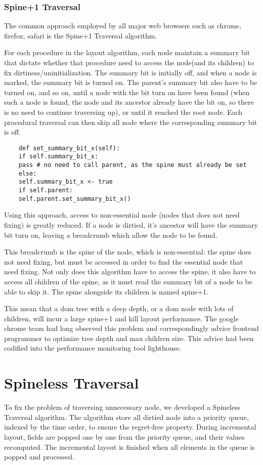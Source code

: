 \documentclass[format=acmsmall, review=false, screen=true]{acmart}
\begin{document}
\subsubsection{Spine+1 Traversal}
The common approach employed by all major web browsers such as chrome, firefox, safari is the Spine+1 Traversal algorithm.

For each procedure in the layout algorithm, each node maintain a summary bit that dictate whether that procedure need to access the node(and its children) to fix dirtiness/uninitialization. The summary bit is initially off, and when a node is marked, the summary bit is turned on. The parent's summary bit also have to be turned on, and so on, until a node with the bit turn on have been found (when such a node is found, the node and its ancestor already have the bit on, so there is no need to continue traversing up), or until it reached the root node.  Each procedural traversal can then skip all node where the corresponding summary bit is off.

\begin{verbatim}
	def set_summary_bit_x(self):
	if self.summary_bit_x:
	pass # no need to call parent, as the spine must already be set
	else:
	self.summary_bit_x <- true
	if self.parent:
	self.parent.set_summary_bit_x()
\end{verbatim}

Using this approach, access to non-essential node (nodes that does not need fixing) is greatly reduced. If a node is dirtied, it's ancestor will have the summary bit turn on, leaving a breadcrumb which allow the node to be found.

This breadcrumb is the spine of the node, which is non-essential: the spine does not need fixing, but must be accessed in order to find the essential node that need fixing. Not only does this algorithm have to access the spine, it also have to access all children of the spine, as it must read the summary bit of a node to be able to skip it. The spine alongside its children is named spine+1.

This mean that a dom tree with a deep depth, or a dom node with lots of children, will incur a large spine+1 and kill layout performance. The google chrome team had long observed this problem and correspondingly advice frontend programmer to optimize tree depth and max children size. This advice had been codified into the performance monitoring tool lighthouse.

\section{Spineless Traversal}
To fix the problem of traversing unnecessary node, we developed a Spineless Traversal algorithm. The algorithm store all dirtied node into a priority queue, indexed by the time order, to ensure the regret-free property. During incremental layout, fields are popped one by one from the priority queue, and their values recomputed. The incremental layout is finished when all elements in the queue is popped and processed.
\end{document}
